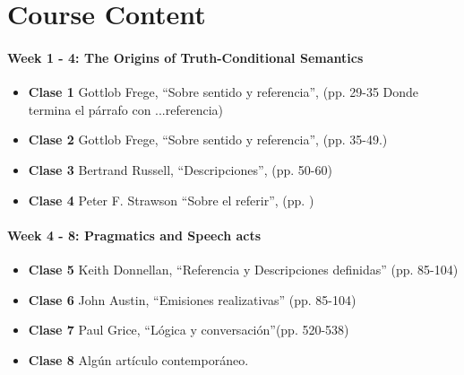 \documentclass{tufte-handout}
\begin{document}
\section{\textbf{Course Content}}

\paragraph{Week 1 - 4: The Origins of Truth-Conditional Semantics}

\begin{itemize}
    \item \textbf{Clase 1} Gottlob Frege, ``Sobre sentido y referencia'', (pp. 29-35  Donde termina el párrafo con ...referencia)

    \item \textbf{Clase 2} Gottlob Frege, ``Sobre sentido y referencia'', (pp. 35-49.)

    \item \textbf{Clase 3} Bertrand Russell, ``Descripciones'', (pp. 50-60)

    \item \textbf{Clase 4} Peter F. Strawson ``Sobre el referir'', (pp. )
\end{itemize}

\paragraph{Week 4 - 8: Pragmatics and Speech acts}


\begin{itemize}
\item \textbf{Clase 5} Keith Donnellan, ``Referencia y Descripciones definidas'' (pp. 85-104)


\item \textbf{Clase 6} John Austin, ``Emisiones realizativas'' (pp. 85-104)


\item \textbf{Clase 7} Paul Grice, ``Lógica y conversación''(pp. 520-538)


\item \textbf{Clase 8} Algún artículo contemporáneo.

\end{itemize}
\end{document}
